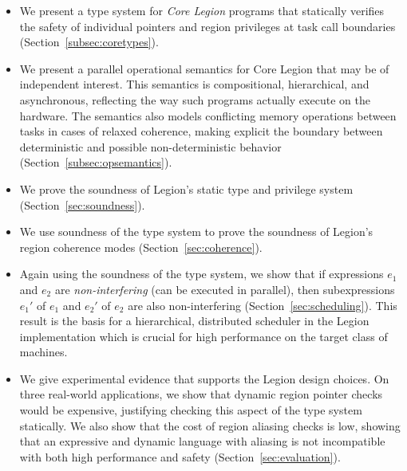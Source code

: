 \begin{itemize}
\item We present a type system for {\em Core Legion} programs that statically
  verifies the safety of individual pointers and region
  privileges at task call boundaries (Section~\ref{subsec:coretypes}).

\item We present a parallel operational semantics for Core Legion that
  may be of independent interest.  This semantics is compositional,
  hierarchical, and asynchronous, reflecting the way such programs
  actually execute on the hardware.  The semantics also
  models conflicting memory operations between tasks in cases of relaxed
  coherence, making explicit the boundary between deterministic and
  possible non-deterministic behavior (Section~\ref{subsec:opsemantics}).

\item We prove the soundness of Legion's static type and privilege system (Section~\ref{sec:soundness}).


\item We use soundness of the type system to prove the soundness of
  Legion's region coherence modes (Section~\ref{sec:coherence}).


\item Again using the soundness of the type system,  we show that if expressions $e_1$ and $e_2$ 
are {\em non-interfering} (can be executed in parallel), then subexpressions
$e_1'$ of $e_1$ and $e_2'$ of $e_2$ are also non-interfering (Section~\ref{sec:scheduling}).  
This result is the basis
for a hierarchical, distributed scheduler in the Legion implementation which is crucial for high performance
on the target class of machines.

\item We give experimental evidence that supports the Legion design choices.  On three
  real-world applications, we show that dynamic region pointer checks
  would be expensive, justifying checking this aspect of the type
  system statically.  We also show that the cost of region aliasing
  checks is low, showing that an expressive and dynamic
  language with aliasing is not incompatible with both high
  performance and safety (Section~\ref{sec:evaluation}).

\end{itemize}






